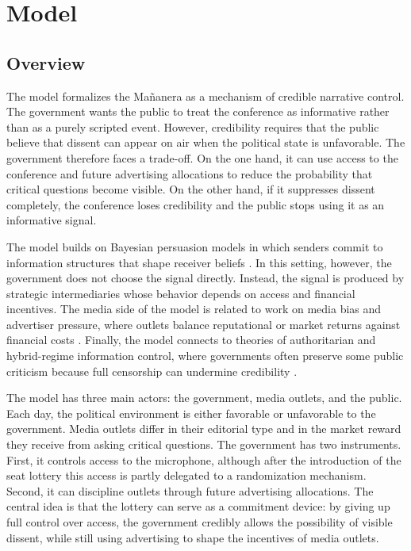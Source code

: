 \section{Model}

\label{sec:model}

\subsection{Overview}

The model formalizes the Ma\~nanera as a mechanism of credible narrative control. The government wants the public to treat the conference as informative rather than as a purely scripted event. However, credibility requires that the public believe that dissent can appear on air when the political state is unfavorable. The government therefore faces a trade-off. On the one hand, it can use access to the conference and future advertising allocations to reduce the probability that critical questions become visible. On the other hand, if it suppresses dissent completely, the conference loses credibility and the public stops using it as an informative signal.

The model builds on Bayesian persuasion models in which senders commit to information structures that shape receiver beliefs \citep{KamenicaGentzkow2011}. In this setting, however, the government does not choose the signal directly. Instead, the signal is produced by strategic intermediaries whose behavior depends on access and financial incentives. The media side of the model is related to work on media bias and advertiser pressure, where outlets balance reputational or market returns against financial costs \citep{GentzkowShapiro2006, EllmanGermano2009}. Finally, the model connects to theories of authoritarian and hybrid-regime information control, where governments often preserve some public criticism because full censorship can undermine credibility \citep{GehlbachSonin2014, ShadmehrBernhardt2015}.

The model has three main actors: the government, media outlets, and the public. Each day, the political environment is either favorable or unfavorable to the government. Media outlets differ in their editorial type and in the market reward they receive from asking critical questions. The government has two instruments. First, it controls access to the microphone, although after the introduction of the seat lottery this access is partly delegated to a randomization mechanism. Second, it can discipline outlets through future advertising allocations. The central idea is that the lottery can serve as a commitment device: by giving up full control over access, the government credibly allows the possibility of visible dissent, while still using advertising to shape the incentives of media outlets.

